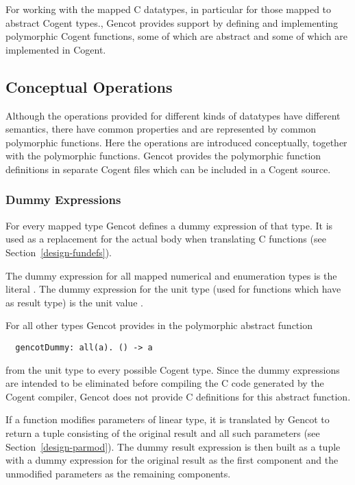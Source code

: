 For working with the mapped C datatypes, in particular for those mapped to abstract Cogent types., Gencot provides support by
defining and implementing polymorphic Cogent functions, some of which are abstract and some of which are implemented in Cogent.

\subsection{Conceptual Operations}
\label{design-operations-concept}

Although the operations provided for different kinds of datatypes have different semantics, there have common properties
and are represented by common polymorphic functions. Here the operations are introduced conceptually, together with
the polymorphic functions. Gencot provides the polymorphic function definitions in separate Cogent files which can be
included in a Cogent source.

\subsubsection{Dummy Expressions}

For every mapped type Gencot defines a dummy expression of that type. It is used as a replacement for the actual 
body when translating C functions (see Section~\ref{design-fundefs}).

The dummy expression for all mapped numerical and enumeration types is the literal .
The dummy expression for the unit type (used for functions which have  as result type) is the 
unit value \code{()}.

For all other types Gencot provides in  the polymorphic abstract function
\begin{verbatim}
  gencotDummy: all(a). () -> a
\end{verbatim}
from the unit type to every possible Cogent type. Since the dummy expressions are intended to be eliminated before compiling the 
C code generated by the Cogent compiler, Gencot does not provide C definitions for this abstract function. 

If a function modifies parameters of linear type, it is translated by Gencot to return a tuple consisting of the 
original result and all such parameters (see Section~\ref{design-parmod}).
The dummy result expression is then built as a tuple with a dummy expression for the original result as the first component 
and the unmodified parameters as the remaining components.

